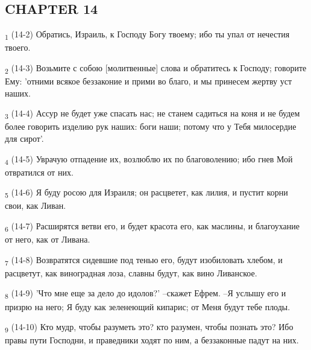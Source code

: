 \subsection{CHAPTER 14}
\begin{tcolorbox}
\textsubscript{1} (14-2) Обратись, Израиль, к Господу Богу твоему; ибо ты упал от нечестия твоего.
\end{tcolorbox}
\begin{tcolorbox}
\textsubscript{2} (14-3) Возьмите с собою [молитвенные] слова и обратитесь к Господу; говорите Ему: 'отними всякое беззаконие и прими во благо, и мы принесем жертву уст наших.
\end{tcolorbox}
\begin{tcolorbox}
\textsubscript{3} (14-4) Ассур не будет уже спасать нас; не станем садиться на коня и не будем более говорить изделию рук наших: боги наши; потому что у Тебя милосердие для сирот'.
\end{tcolorbox}
\begin{tcolorbox}
\textsubscript{4} (14-5) Уврачую отпадение их, возлюблю их по благоволению; ибо гнев Мой отвратился от них.
\end{tcolorbox}
\begin{tcolorbox}
\textsubscript{5} (14-6) Я буду росою для Израиля; он расцветет, как лилия, и пустит корни свои, как Ливан.
\end{tcolorbox}
\begin{tcolorbox}
\textsubscript{6} (14-7) Расширятся ветви его, и будет красота его, как маслины, и благоухание от него, как от Ливана.
\end{tcolorbox}
\begin{tcolorbox}
\textsubscript{7} (14-8) Возвратятся сидевшие под тенью его, будут изобиловать хлебом, и расцветут, как виноградная лоза, славны будут, как вино Ливанское.
\end{tcolorbox}
\begin{tcolorbox}
\textsubscript{8} (14-9) 'Что мне еще за дело до идолов?' --скажет Ефрем. --Я услышу его и призрю на него; Я буду как зеленеющий кипарис; от Меня будут тебе плоды.
\end{tcolorbox}
\begin{tcolorbox}
\textsubscript{9} (14-10) Кто мудр, чтобы разуметь это? кто разумен, чтобы познать это? Ибо правы пути Господни, и праведники ходят по ним, а беззаконные падут на них.
\end{tcolorbox}
